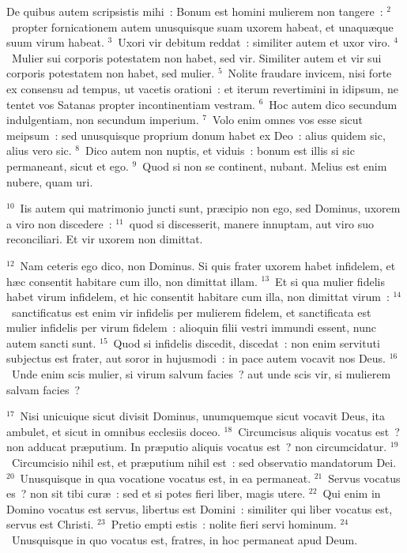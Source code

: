 \lettrine[lines=3,image=true,loversize=0.05,lraise=-0.03]{D}{}e quibus autem scripsistis mihi~: Bonum est homini mulierem non tangere~:
${}^{2}$~propter fornicationem autem unusquisque suam uxorem habeat, et unaqu\ae que suum virum habeat.
${}^{3}$~Uxori vir debitum reddat~: similiter autem et uxor viro.
${}^{4}$~Mulier sui corporis potestatem non habet, sed vir. Similiter autem et vir sui corporis potestatem non habet, sed mulier.
${}^{5}$~Nolite fraudare invicem, nisi forte ex consensu ad tempus, ut vacetis orationi~: et iterum revertimini in idipsum, ne tentet vos Satanas propter incontinentiam vestram.
${}^{6}$~Hoc autem dico secundum indulgentiam, non secundum imperium.
${}^{7}$~Volo enim omnes vos esse sicut meipsum~: sed unusquisque proprium donum habet ex Deo~: alius quidem sic, alius vero sic.
${}^{8}$~Dico autem non nuptis, et viduis~: bonum est illis si sic permaneant, sicut et ego.
${}^{9}$~Quod si non se continent, nubant. Melius est enim nubere, quam uri.


${}^{10}$~Iis autem qui matrimonio juncti sunt, pr\ae cipio non ego, sed Dominus, uxorem a viro non discedere~:
${}^{11}$~quod si discesserit, manere innuptam, aut viro suo reconciliari. Et vir uxorem non dimittat.


${}^{12}$~Nam ceteris ego dico, non Dominus. Si quis frater uxorem habet infidelem, et h\ae c consentit habitare cum illo, non dimittat illam.
${}^{13}$~Et si qua mulier fidelis habet virum infidelem, et hic consentit habitare cum illa, non dimittat virum~:
${}^{14}$~sanctificatus est enim vir infidelis per mulierem fidelem, et sanctificata est mulier infidelis per virum fidelem~: alioquin filii vestri immundi essent, nunc autem sancti sunt.
${}^{15}$~Quod si infidelis discedit, discedat~: non enim servituti subjectus est frater, aut soror in hujusmodi~: in pace autem vocavit nos Deus.
${}^{16}$~Unde enim scis mulier, si virum salvum facies~? aut unde scis vir, si mulierem salvam facies~?


${}^{17}$~Nisi unicuique sicut divisit Dominus, unumquemque sicut vocavit Deus, ita ambulet, et sicut in omnibus ecclesiis doceo.
${}^{18}$~Circumcisus aliquis vocatus est~? non adducat pr\ae putium. In pr\ae putio aliquis vocatus est~? non circumcidatur.
${}^{19}$~Circumcisio nihil est, et pr\ae putium nihil est~: sed observatio mandatorum Dei.
${}^{20}$~Unusquisque in qua vocatione vocatus est, in ea permaneat.
${}^{21}$~Servus vocatus es~? non sit tibi cur\ae~: sed et si potes fieri liber, magis utere.
${}^{22}$~Qui enim in Domino vocatus est servus, libertus est Domini~: similiter qui liber vocatus est, servus est Christi.
${}^{23}$~Pretio empti estis~: nolite fieri servi hominum.
${}^{24}$~Unusquisque in quo vocatus est, fratres, in hoc permaneat apud Deum.


